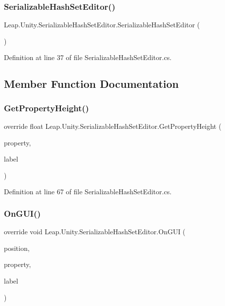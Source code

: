 \subsubsection{\texorpdfstring{SerializableHashSetEditor()}{SerializableHashSetEditor()}}
{\footnotesize\ttfamily Leap.\+Unity.\+Serializable\+Hash\+Set\+Editor.\+Serializable\+Hash\+Set\+Editor (\begin{DoxyParamCaption}{ }\end{DoxyParamCaption})}



Definition at line 37 of file Serializable\+Hash\+Set\+Editor.\+cs.



\subsection{Member Function Documentation}
\mbox{\label{class_leap_1_1_unity_1_1_serializable_hash_set_editor_aaf4c9ebaf338b9386ca150b875dbb432}} 
\subsubsection{\texorpdfstring{GetPropertyHeight()}{GetPropertyHeight()}}
{\footnotesize\ttfamily override float Leap.\+Unity.\+Serializable\+Hash\+Set\+Editor.\+Get\+Property\+Height (\begin{DoxyParamCaption}\item[{Serialized\+Property}]{property,  }\item[{G\+U\+I\+Content}]{label }\end{DoxyParamCaption})}



Definition at line 67 of file Serializable\+Hash\+Set\+Editor.\+cs.

\mbox{\label{class_leap_1_1_unity_1_1_serializable_hash_set_editor_adf9a92009da4406039ef0753826d173f}} 
\subsubsection{\texorpdfstring{OnGUI()}{OnGUI()}}
{\footnotesize\ttfamily override void Leap.\+Unity.\+Serializable\+Hash\+Set\+Editor.\+On\+G\+UI (\begin{DoxyParamCaption}\item[{Rect}]{position,  }\item[{Serialized\+Property}]{property,  }\item[{G\+U\+I\+Content}]{label }\end{DoxyParamCaption})}



